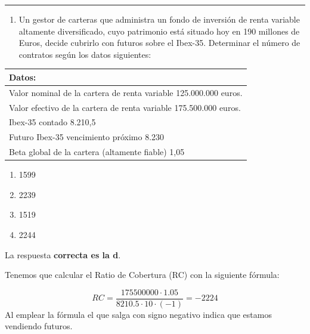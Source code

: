 \documentclass[
  letterpaper,
  DIV=11,
  numbers=noendperiod]{scrreprt}
\providecommand{\tightlist}{%
  \setlength{\itemsep}{0pt}\setlength{\parskip}{0pt}}\usepackage{longtable,booktabs,array}
\begin{document}
\begin{center}\rule{0.5\linewidth}{0.5pt}\end{center}

\begin{enumerate}
\def\labelenumi{\arabic{enumi}.}
\setcounter{enumi}{52}
\tightlist
\item
  Un gestor de carteras que administra un fondo de inversión de renta
  variable altamente diversificado, cuyo patrimonio está situado hoy en
  190 millones de Euros, decide cubrirlo con futuros sobre el Ibex-35.
  Determinar el número de contratos según los datos siguientes:
\end{enumerate}

\begin{longtable}[]{@{}l@{}}
\toprule()
\textbf{Datos:} \\
\midrule()
\endhead
Valor nominal de la cartera de renta variable 125.000.000 euros. \\
Valor efectivo de la cartera de renta variable 175.500.000 euros. \\
Ibex-35 contado 8.210,5 \\
Futuro Ibex-35 vencimiento próximo 8.230 \\
Beta global de la cartera (altamente fiable) 1,05 \\
\bottomrule()
\end{longtable}

\begin{enumerate}
\def\labelenumi{\alph{enumi})}
\item
  1599
\item
  2239
\item
  1519
\item
  2244
\end{enumerate}

\begin{tcolorbox}[enhanced jigsaw, left=2mm, opacityback=0, colback=white, breakable, arc=.35mm, bottomrule=.15mm, rightrule=.15mm, toprule=.15mm, leftrule=.75mm, colframe=quarto-callout-tip-color-frame]
\begin{minipage}[t]{5.5mm}
\textcolor{quarto-callout-tip-color}{\faLightbulb}
\end{minipage}%
\begin{minipage}[t]{\textwidth - 5.5mm}

La respuesta \textbf{correcta es la d}.

Tenemos que calcular el Ratio de Cobertura (RC) con la siguiente
fórmula:

\[RC=\frac{175500000\cdot1.05}{8210.5\cdot10\cdot(-1)}=-2224\] Al
emplear la fórmula el que salga con signo negativo indica que estamos
vendiendo futuros.

\end{minipage}%
\end{tcolorbox}
\end{document}
